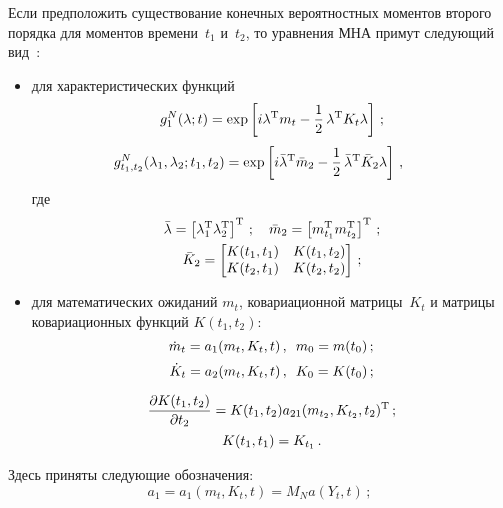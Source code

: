 \begin{multicols}{2}
Если предположить существование конечных вероятностных
моментов второго порядка для моментов времени~$t_1$ и~$t_2$, то уравнения
МНА примут следующий вид~\cite{2-sin, 3-sin}:
\begin{itemize}
\item  для характеристических функций
    \begin{equation}
    g_1^N (\lambda;t) =\exp \left[ i\lambda^{\mathrm{T}} m_t - \displaystyle\frac{\displaystyle 1\mathstrut}{\displaystyle 2\mathstrut}\, \lambda^{\mathrm{T}} K_t \lambda\right]\,;\label{e2.4-sin}
    \end{equation}
\begin{equation}
\hspace*{-7.5mm}g_{t_1, t_2}^N (\la_1, \la_2;t_1, t_2 ) =\exp \lk i\bar \la^{\mathrm{T}} \bar m_2 -
\fr{1}{2}\, \bar \la^{\mathrm{T}} \bar K_2 \la\rk\,,\!\!\label{e2.5-sin}
\end{equation}
где
    \begin{gather*}
    \bar {\lambda} =\left[ \lambda_1^{\mathrm{T}}\lambda_2^{\mathrm{T}}\right]^{\mathrm{T}}\,; \quad
        \bar m_2 = \left[ m_{t_1}^{\mathrm{T}} m_{t_2}^{\mathrm{T}}\right]^{\mathrm{T}}\,;\\
        \bar K_2= \begin{bmatrix}
    K(t_1, t_1)& K(t_1, t_2)\\
    K(t_2, t_1)& K(t_2, t_2)
    \end{bmatrix}\,;
    \end{gather*}

\item для математических ожиданий  $m_t$, ковариационной матрицы~$K_t$ и
матрицы ковариационных функций $K(t_1, t_2)$:
    \begin{equation}
    \dot m_t = a_1 (m_t, K_t, t)\,,\enskip m_0 = m(t_0)\,;\label{e2.6-sin}
    \end{equation}
\begin{equation}
\dot K_t = a_2 (m_t, K_t, t)\,,\enskip K_0 = K(t_0)\,;\label{e2.7-sin}
\end{equation}

\vspace*{-12pt}

\noindent
\begin{multline}
\displaystyle\frac{\displaystyle \partial K(t_1, t_2)\mathstrut}{\displaystyle \partial t_2 \mathstrut}= K(t_1, t_2) a_{21} (m_{t_2}, K_{t_2}, t_2)^{\mathrm{T}}\,;\\
K(t_1, t_1) = K_{t_1}\,.
\label{e2.8-sin}
\end{multline}
    \end{itemize}
Здесь приняты следующие обозначения:
\begin{equation}
a_1 = a_1 (m_t, K_t, t) = M_N a (Y_t, t)\,;\label{e2.9-sin}
\end{equation}


\end{multicols}
